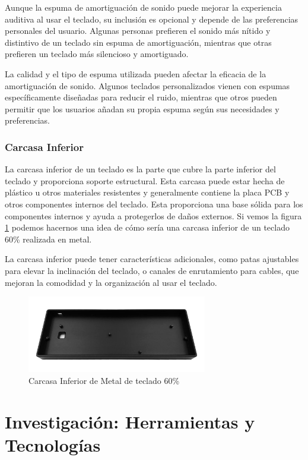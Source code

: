 Aunque la espuma de amortiguación de sonido puede mejorar la experiencia auditiva al usar el teclado, su inclusión es opcional y depende de las preferencias personales del usuario. Algunas personas prefieren el sonido más nítido y distintivo de un teclado sin espuma de amortiguación, mientras que otras prefieren un teclado más silencioso y amortiguado.

La calidad y el tipo de espuma utilizada pueden afectar la eficacia de la amortiguación de sonido. Algunos teclados personalizados vienen con espumas específicamente diseñadas para reducir el ruido, mientras que otros pueden permitir que los usuarios añadan su propia espuma según sus necesidades y preferencias.

\subsubsection{Carcasa Inferior}

La carcasa inferior de un teclado es la parte que cubre la parte inferior del teclado y proporciona soporte estructural. Esta carcasa puede estar hecha de plástico u otros materiales resistentes y generalmente contiene la placa \gls{PCB} y otros componentes internos del teclado. Esta proporciona una base sólida para los componentes internos y ayuda a protegerlos de daños externos. Si vemos la figura \ref{fig:BottomCase} podemos hacernos una idea de cómo sería una carcasa inferior de un teclado 60\% realizada en metal.

La carcasa inferior puede tener características adicionales, como patas ajustables para elevar la inclinación del teclado, o canales de enrutamiento para cables, que mejoran la comodidad y la organización al usar el teclado.

\begin{figure}[H]
    \centering
    \includegraphics[width=0.7\textwidth]{imagenes/Capitulos/Cap03/BottomCase.png}
    \caption{Carcasa Inferior de Metal de teclado 60\%}
    \label{fig:BottomCase}
\end{figure}

\section{Investigación: Herramientas y Tecnologías}

